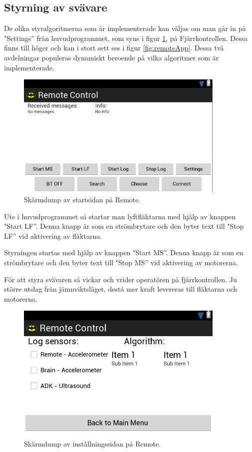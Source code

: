 \subsection{Styrning av svävare}
De olika styralgoritmerna som är implementerade kan väljas om man går in på
"Settings” från huvudprogrammet, som syns i figur \ref{fig:remote}, på
Fjärrkontrollen.
Dessa finns till höger och kan i stort sett ses i figur \ref{fig:remoteApp}. Dessa två avdelningar
populeras dynamiskt beroende på vilka algoritmer som är implementerade.

\begin{figure}[htbp!]
\centering
\includegraphics[width=10cm]{../../includes/figures/remote.png}
\caption{Skärmdump av startsidan på Remote.}
\label{fig:remote}
\end{figure}

Ute i huvudprogrammet så startar man lyftfläktarna med hjälp av knappen "Start
LF”. Denna knapp är som en strömbrytare och den byter text till "Stop LF” vid
aktivering av fläktarna.

Styrningen startas med hjälp av knappen "Start
MS”. Denna knapp är som en strömbrytare och den byter text till "Stop MS” vid
aktivering av motorerna.

För att styra svävaren så vickar och vrider operatören på fjärrkontrollen. Ju
större utslag från jämnviktsläget, destå mer kraft levereras till fläktarna och
motorerna.

\begin{figure}[htbp!]
\centering
\includegraphics[width=10cm]{../../includes/figures/remote_settings.png}
\caption{Skärmdump av inställningssidan på Remote.}
\label{fig:remoteSettings}
\end{figure}

